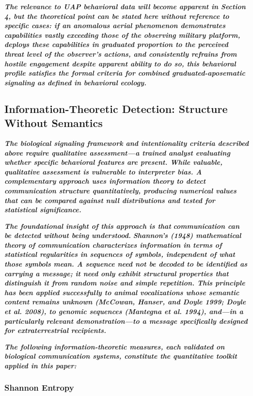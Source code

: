 \documentclass[11pt,letterpaper]{article}
\begin{document}
\textbf{\textit{The relevance to UAP behavioral data will become apparent in Section 4, but the theoretical point can be stated here without reference to specific cases: if an anomalous aerial phenomenon demonstrates capabilities vastly exceeding those of the observing military platform, deploys these capabilities in graduated proportion to the perceived threat level of the observer's actions, and consistently refrains from hostile engagement despite apparent ability to do so, this behavioral profile satisfies the formal criteria for combined graduated-aposematic signaling as defined in behavioral ecology.}}


\subsection{Information-Theoretic Detection: Structure Without Semantics}

\textbf{\textit{The biological signaling framework and intentionality criteria described above require qualitative assessment---a trained analyst evaluating whether specific behavioral features are present. While valuable, qualitative assessment is vulnerable to interpreter bias. A complementary approach uses information theory to detect communication structure quantitatively, producing numerical values that can be compared against null distributions and tested for statistical significance.}}


\textbf{\textit{The foundational insight of this approach is that }}\textbf{\textit{communication can be detected without being understood.}}\textbf{\textit{ Shannon's (1948) mathematical theory of communication characterizes information in terms of statistical regularities in sequences of symbols, independent of what those symbols mean. A sequence need not be decoded to be identified as carrying a message; it need only exhibit structural properties that distinguish it from random noise and simple repetition. This principle has been applied successfully to animal vocalizations whose semantic content remains unknown (McCowan, Hanser, and Doyle 1999; Doyle et al. 2008), to genomic sequences (Mantegna et al. 1994), and---in a particularly relevant demonstration---to a message specifically designed for extraterrestrial recipients.}}


\textbf{\textit{The following information-theoretic measures, each validated on biological communication systems, constitute the quantitative toolkit applied in this paper:}}


\subsubsection{Shannon Entropy}
\end{document}
